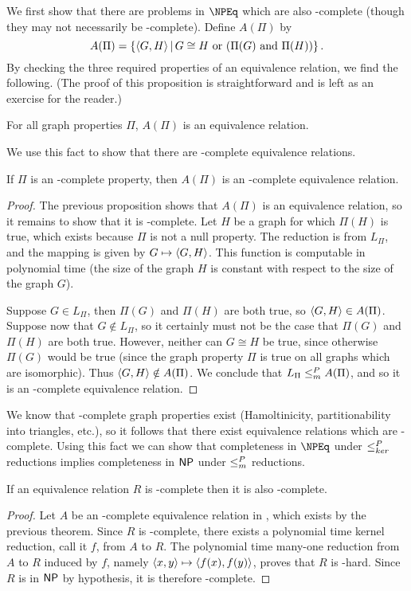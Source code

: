 We first show that there are problems in $\NPEq$ which are also \NP-complete (though they may not necessarily be \NPEq-complete).
Define $A(\Pi)$ by
\begin{displaymath}
  A(\Pi) = \left\{ \langle G,H\rangle\,\middle|\, G\cong H \text{ or } (\Pi(G) \text{ and } \Pi(H))\right\}.
\end{displaymath}
By checking the three required properties of an equivalence relation, we find the following.
(The proof of this proposition is straightforward and is left as an exercise for the reader.)
\begin{proposition}
  For all graph properties $\Pi$, $A(\Pi)$ is an equivalence relation.
\end{proposition}
We use this fact to show that there are \NP-complete equivalence relations.
\begin{proposition}\label{prop:APi}
  If $\Pi$ is an \NP-complete property, then $A(\Pi)$ is an \NP-complete equivalence relation.
\end{proposition}
\begin{proof}
  The previous proposition shows that $A(\Pi)$ is an equivalence relation, so it remains to show that it is \NP-complete.
  Let $H$ be a graph for which $\Pi(H)$ is true, which exists because $\Pi$ is not a null property.
  The reduction is from $L_\Pi$, and the mapping is given by $G\mapsto\langle G,H\rangle$.
  This function is computable in polynomial time (the size of the graph $H$ is constant with respect to the size of the graph $G$).

  Suppose $G\in L_\Pi$, then $\Pi(G)$ and $\Pi(H)$ are both true, so $\langle G,H\rangle\in A(\Pi)$.
  Suppose now that $G\notin L_\Pi$, so it certainly must not be the case that $\Pi(G)$ and $\Pi(H)$ are both true.
  However, neither can $G\cong H$ be true, since otherwise $\Pi(G)$ would be true (since the graph property $\Pi$ is true on all graphs which are isomorphic).
  Thus $\langle G,H\rangle\notin A(\Pi)$.
  We conclude that $L_\Pi\leq^{P}_{m} A(\Pi)$, and so it is an \NP-complete equivalence relation.
\end{proof}

We know that \NP-complete graph properties exist (Hamoltinicity, partitionability into triangles, etc.), so it follows that there exist equivalence relations which are \NP-complete.
Using this fact we can show that completeness in $\NPEq$ under $\leq^{P}_{ker}$ reductions implies completeness in ${\mathsf{NP}}$ under $\leq^{P}_{m}$ reductions.

\begin{corollary}
  If an equivalence relation $R$ is \NPEq-complete then it is also \NP-complete.
\end{corollary}
\begin{proof}
  Let $A$ be an \NP-complete equivalence relation in \NPEq, which exists by the previous theorem.
  Since $R$ is \NPEq-complete, there exists a polynomial time kernel reduction, call it $f$, from $A$ to $R$.
  The polynomial time many-one reduction from $A$ to $R$ induced by $f$, namely $\langle x,y\rangle\mapsto\langle f(x),f(y)\rangle$, proves that $R$ is \NP-hard.
  Since $R$ is in ${\mathsf{NP}}$ by hypothesis, it is therefore \NP-complete.
\end{proof}

